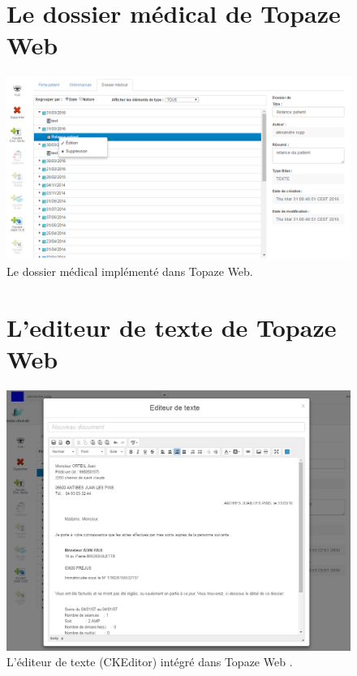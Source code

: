 \begin{appendices}
\begin{figure}[H]
\section*{Le dossier médical de Topaze Web}
  \centering
  \includegraphics[width=18cm]{./img/dossier_medical_web2}
  \caption{\label{fig:dossier_web} Le dossier médical implémenté dans Topaze Web.}
\end{figure}

\newpage
\begin{figure}[H]
\section*{L'editeur de texte de Topaze Web}
  \centering
  \includegraphics[width=18cm]{./img/editeur_topaze_web}
  \caption{\label{fig:editeur_web} L'éditeur de texte (CKEditor) intégré dans Topaze Web .}
\end{figure}

\end{appendices}

